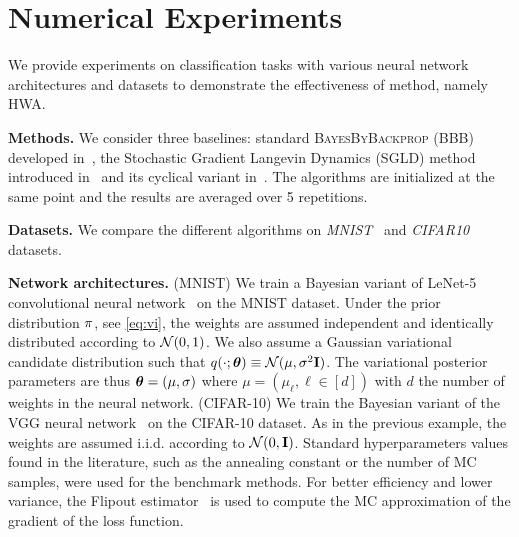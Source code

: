 \documentclass[tablecaption=bottom,wcp]{jmlr} %
\begin{document}
\section{Numerical Experiments}\label{sec:numerical}
We provide experiments on classification tasks with various neural network architectures and datasets to demonstrate the effectiveness of method, namely HWA.

\vspace{0.08in}
\noindent \textbf{Methods.}\hspace{0.1in}
We consider three baselines: standard \textsc{BayesByBackprop} (BBB) developed in~\citep{blundell2015weight}, the Stochastic Gradient Langevin Dynamics (SGLD) method introduced in~\citep{welling2011bayesian} and its cyclical variant in~\citep{zhang2019cyclical}.
The algorithms are initialized at the same point and the results are averaged over 5 repetitions.

\vspace{0.08in}
\noindent \textbf{Datasets.}\hspace{0.1in}
We compare the different algorithms on \textit{MNIST}~\citep{lecun-mnisthandwrittendigit-2010} and \textit{CIFAR10}~\citep{krizhevsky2009learning} datasets.

\vspace{0.08in}
\noindent \textbf{Network architectures.} \hspace{0.1in}
(MNIST) We train a Bayesian variant of LeNet-5 convolutional neural network~\citep{lecun1998gradient} on the MNIST dataset. 
Under the prior distribution $\prior$, see \eqref{eq:vi}, the weights are assumed independent and identically distributed according to ${\cal N}(0,1)$.
We also assume a Gaussian variational candidate distribution such that $q(\cdot; \param) \equiv  \mathcal{N}(\mu,\sigma^2 \Id )$.
The variational posterior parameters are thus $\param = (\mu, \sigma) $ where $\mu = (\mu_\ell, \ell \in [d])$ with $d$ the number of weights in the neural network. 
(CIFAR-10) We train the Bayesian variant of the VGG neural network~\citep{simonyan2014very} on the CIFAR-10 dataset.
As in the previous example, the weights are assumed i.i.d. according to ${\cal N}(0,\Id)$.
Standard hyperparameters values found in the literature, such as the annealing constant or the number of MC samples, were used for the benchmark methods. 
For better efficiency and lower variance, the Flipout estimator~\citep{wen2018flipout} is used to compute the MC approximation of the gradient of the loss function.
\end{document}
